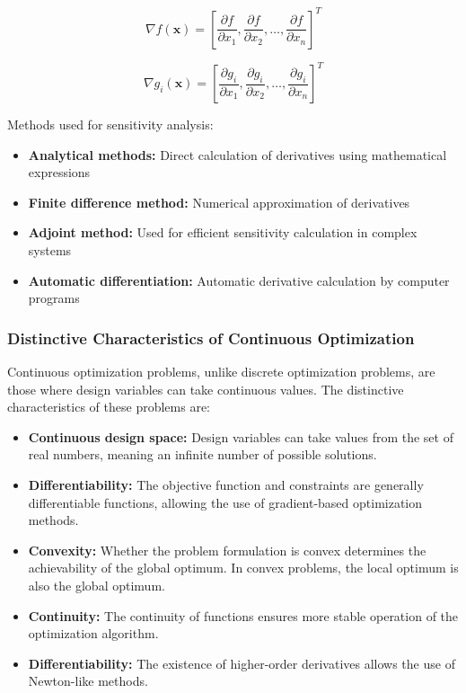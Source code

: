\begin{equation}
\nabla f(\mathbf{x}) = \left[ \frac{\partial f}{\partial x_1}, \frac{\partial f}{\partial x_2}, \ldots, \frac{\partial f}{\partial x_n} \right]^T
\end{equation}

\begin{equation}
\nabla g_i(\mathbf{x}) = \left[ \frac{\partial g_i}{\partial x_1}, \frac{\partial g_i}{\partial x_2}, \ldots, \frac{\partial g_i}{\partial x_n} \right]^T
\end{equation}

Methods used for sensitivity analysis:
\begin{itemize}
    \item \textbf{Analytical methods:} Direct calculation of derivatives using mathematical expressions
    \item \textbf{Finite difference method:} Numerical approximation of derivatives
    \item \textbf{Adjoint method:} Used for efficient sensitivity calculation in complex systems
    \item \textbf{Automatic differentiation:} Automatic derivative calculation by computer programs
\end{itemize}

\subsubsection{Distinctive Characteristics of Continuous Optimization}
Continuous optimization problems, unlike discrete optimization problems, are those where design variables can take continuous values. The distinctive characteristics of these problems are:

\begin{itemize}
    \item \textbf{Continuous design space:} Design variables can take values from the set of real numbers, meaning an infinite number of possible solutions.
    
    \item \textbf{Differentiability:} The objective function and constraints are generally differentiable functions, allowing the use of gradient-based optimization methods.
    
    \item \textbf{Convexity:} Whether the problem formulation is convex determines the achievability of the global optimum. In convex problems, the local optimum is also the global optimum.
    
    \item \textbf{Continuity:} The continuity of functions ensures more stable operation of the optimization algorithm.
    
    \item \textbf{Differentiability:} The existence of higher-order derivatives allows the use of Newton-like methods.
\end{itemize}


